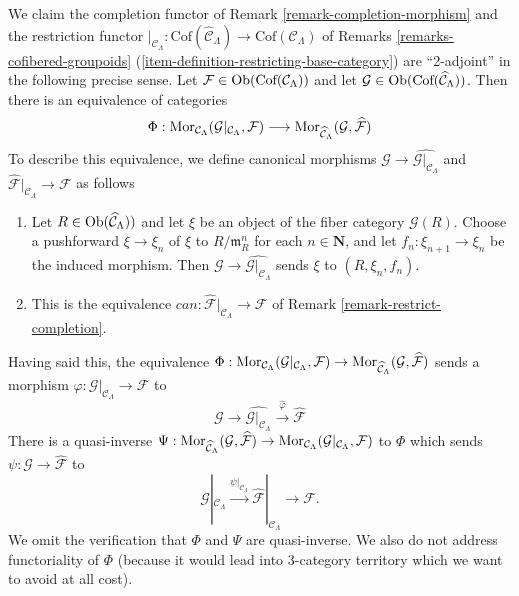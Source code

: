 \begin{remark}
\label{remark-completion-restriction-adjoint}
We claim the completion functor of
Remark \ref{remark-completion-morphism}
and the restriction functor
$|_{\mathcal{C}_\Lambda} : \text{Cof}(\widehat{\mathcal{C}}_\Lambda)
\to \text{Cof}(\mathcal{C}_\Lambda)$ of
Remarks \ref{remarks-cofibered-groupoids}
(\ref{item-definition-restricting-base-category})
are ``2-adjoint'' in the following precise sense. Let
$\mathcal{F} \in \mathop{\mathrm{Ob}}\nolimits(\text{Cof}(\mathcal{C}_\Lambda))$
and let
$\mathcal{G} \in \mathop{\mathrm{Ob}}\nolimits(\text{Cof}(\widehat{\mathcal{C}}_\Lambda))$.
Then there is an equivalence of categories
$$
\Phi :
\mathop{\mathrm{Mor}}\nolimits_{\mathcal{C}_\Lambda}(
\mathcal{G}|_{\mathcal{C}_\Lambda}, \mathcal{F})
\longrightarrow
\mathop{\mathrm{Mor}}\nolimits_{\widehat{\mathcal{C}}_\Lambda}(\mathcal{G}, \widehat{\mathcal{F}})
$$
To describe this equivalence, we
define canonical morphisms
$\mathcal{G} \to \widehat{\mathcal{G}|_{\mathcal{C}_\Lambda}}$ and
$\widehat{\mathcal{F}}|_{\mathcal{C}_\Lambda} \to \mathcal{F}$ as follows
\begin{enumerate}
\item Let $R \in \mathop{\mathrm{Ob}}\nolimits(\widehat{\mathcal{C}}_\Lambda))$ and let $\xi$
be an object of the fiber category $\mathcal{G}(R)$.
Choose a pushforward $\xi \to \xi_n$ of $\xi$ to
$R/\mathfrak m_R^n$ for each $n \in \mathbf{N}$, and let
$f_n : \xi_{n + 1} \to \xi_n$ be the induced morphism.
Then $\mathcal{G} \to \widehat{\mathcal{G}|_{\mathcal{C}_\Lambda}}$
sends $\xi$ to $(R, \xi_n, f_n)$.
\item This is the equivalence
$can : \widehat{\mathcal{F}}|_{\mathcal{C}_\Lambda} \to \mathcal{F}$
of
Remark \ref{remark-restrict-completion}.
\end{enumerate}
Having said this, the equivalence
$\Phi : \mathop{\mathrm{Mor}}\nolimits_{\mathcal{C}_\Lambda}(
\mathcal{G}|_{\mathcal{C}_\Lambda}, \mathcal{F})  \to
\mathop{\mathrm{Mor}}\nolimits_{\widehat{\mathcal{C}}_\Lambda}(\mathcal{G},
\widehat{\mathcal{F}})$
sends a morphism
$\varphi : \mathcal{G}|_{\mathcal{C}_\Lambda} \to \mathcal{F}$
to
$$
\mathcal{G} \to \widehat{\mathcal{G}|_{\mathcal{C}_\Lambda}}
\xrightarrow{\widehat{\varphi}} \widehat{\mathcal{F}}
$$
There is a quasi-inverse
$\Psi :
\mathop{\mathrm{Mor}}\nolimits_{\widehat{\mathcal{C}}_\Lambda}(
\mathcal{G}, \widehat{\mathcal{F}}) \to
\mathop{\mathrm{Mor}}\nolimits_{\mathcal{C}_\Lambda}(
\mathcal{G}|_{\mathcal{C}_\Lambda}, \mathcal{F})$
to $\Phi$ which sends $\psi : \mathcal{G} \to \widehat{\mathcal{F}}$ to
$$
\mathcal{G}|_{\mathcal{C}_\Lambda} \xrightarrow{\psi|_{\mathcal{C}_\Lambda}}
\widehat{\mathcal{F}}|_{\mathcal{C}_\Lambda} \to \mathcal{F}.
$$
We omit the verification that $\Phi$ and $\Psi$ are quasi-inverse.
We also do not address functoriality of $\Phi$ (because it would
lead into 3-category territory which we want to avoid at all cost).
\end{remark}

